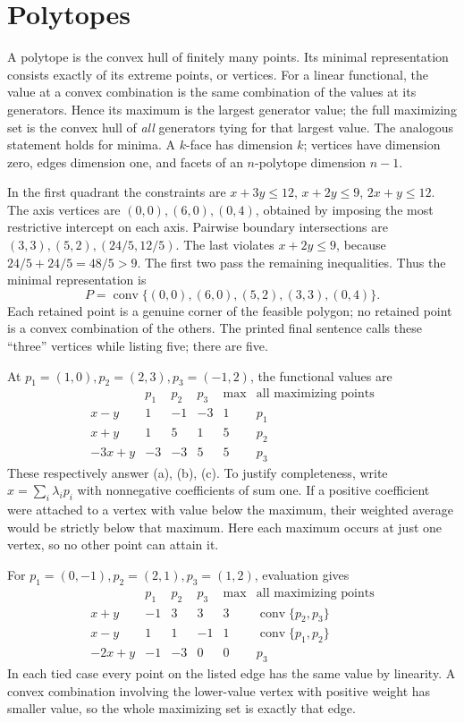 \section{Polytopes}
A polytope is the convex hull of finitely many points. Its minimal
representation consists exactly of its extreme points, or vertices.
For a linear functional, the value at a convex combination is the same
combination of the values at its generators. Hence its maximum is the
largest generator value; the full maximizing set is the convex hull of
\emph{all} generators tying for that largest value. The analogous statement
holds for minima. A $k$-face has dimension $k$; vertices have dimension zero,
edges dimension one, and facets of an $n$-polytope dimension $n-1$.

In the first quadrant the constraints are
$x+3y\le12$, $x+2y\le9$, $2x+y\le12$.
The axis vertices are $(0,0),(6,0),(0,4)$, obtained by imposing the most
restrictive intercept on each axis. Pairwise boundary intersections are
$(3,3),(5,2),(24/5,12/5)$. The last violates $x+2y\le9$, because
$24/5+24/5=48/5>9$. The first two pass the remaining inequalities.
Thus the minimal representation is
\[
 P=\operatorname{conv}\{(0,0),(6,0),(5,2),(3,3),(0,4)\}.
\]
Each retained point is a genuine corner of the feasible polygon; no retained
point is a convex combination of the others. The printed final sentence
calls these ``three'' vertices while listing five; there are five.

At $p_1=(1,0),p_2=(2,3),p_3=(-1,2)$, the functional values are
\[
 \begin{array}{c|rrr|c|l}
 &p_1&p_2&p_3&\max&\text{all maximizing points}\\\hline
 x-y&1&-1&-3&1&p_1\\
 x+y&1&5&1&5&p_2\\
 -3x+y&-3&-3&5&5&p_3
 \end{array}
\]
These respectively answer (a), (b), (c). To justify completeness, write
$x=\sum_i\lambda_ip_i$ with nonnegative coefficients of sum one.
If a positive coefficient were attached to a vertex with value below the
maximum, their weighted average would be strictly below that maximum.
Here each maximum occurs at just one vertex, so no other point can attain it.

For $p_1=(0,-1),p_2=(2,1),p_3=(1,2)$, evaluation gives
\[
 \begin{array}{c|rrr|c|l}
 &p_1&p_2&p_3&\max&\text{all maximizing points}\\\hline
 x+y&-1&3&3&3&\operatorname{conv}\{p_2,p_3\}\\
 x-y&1&1&-1&1&\operatorname{conv}\{p_1,p_2\}\\
 -2x+y&-1&-3&0&0&p_3
 \end{array}
\]
In each tied case every point on the listed edge has the same value by
linearity. A convex combination involving the lower-value vertex with
positive weight has smaller value, so the whole maximizing set is exactly that edge.

